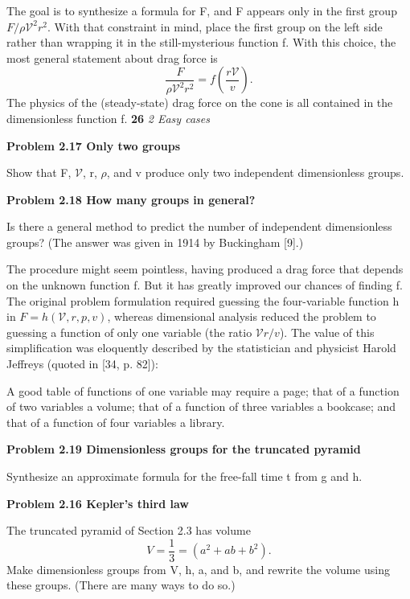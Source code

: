 \documentclass[a4paper, 12pt]{book}
\begin{document}
The goal is to synthesize a formula for F, and F appears only in the first
group $F/\rho\mathcal{V}^2r^2$. With that constraint in mind, place the first group on the
left side rather than wrapping it in the still-mysterious function f. With
this choice, the most general statement about drag force is
\begin{equation}\frac{F}{\rho\mathcal{V}^2r^2}=f\left(\frac{r\mathcal{V}}{v}\right).\end{equation}
The physics of the (steady-state) drag force on the cone is all contained
in the dimensionless function f.
\newpage
\large\textbf{26} \hfill \textit{2 Easy cases} \\
\colorbox{light-gray}{
\begin{minipage}{\textwidth}
\textbf {Problem 2.17 Only two groups}

Show that F, $\mathcal{V}$, r, $\rho$, and v produce only two independent dimensionless groups.

\textbf {Problem 2.18 How many groups in general?}

Is there a general method to predict the number of independent dimensionless
groups? (The answer was given in 1914 by Buckingham [9].)
\end{minipage}}
The procedure might seem pointless, having produced a drag force that
depends on the unknown function f. But it has greatly improved our
chances of finding f. The original problem formulation required guessing
the four-variable function h in $F = h(\mathcal{V}, r, p, v)$, whereas dimensional
analysis reduced the problem to guessing a function of only one variable
(the ratio $\mathcal{V}r/v$). The value of this simplification was eloquently described
by the statistician and physicist Harold Jeffreys (quoted in [34, p. 82]):

\normalsize{A good table of functions of one variable may require a page; that of a function
of two variables a volume; that of a function of three variables a bookcase;
and that of a function of four variables a library.}

\large
\colorbox{light-gray}{
\begin{minipage}{\textwidth}
\textbf {Problem 2.19 Dimensionless groups for the truncated pyramid}

Synthesize an approximate formula for the free-fall time t from g and h.

\textbf {Problem 2.16 Kepler’s third law}

The truncated pyramid of Section 2.3 has volume
\begin{equation}V=\frac{1}{3}=\left(a^2 + ab + b^2\right).\end{equation}
Make dimensionless groups from V, h, a, and b, and rewrite the volume using
these groups. (There are many ways to do so.)
\end{minipage}
} 
\end{document}
